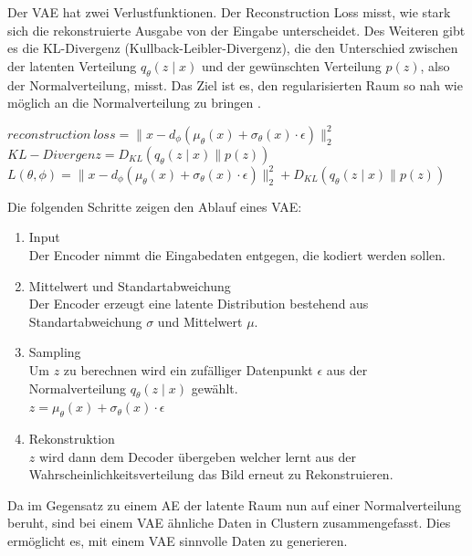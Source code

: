             Der VAE hat zwei Verlustfunktionen. Der Reconstruction Loss misst, wie stark sich die rekonstruierte Ausgabe von der Eingabe unterscheidet. Des Weiteren gibt es die KL-Divergenz (Kullback-Leibler-Divergenz), die den Unterschied zwischen der latenten Verteilung $q_\theta(z \mid x)$ und der gewünschten Verteilung $p(z)$, also der Normalverteilung, misst. Das Ziel ist es, den regularisierten Raum so nah wie möglich an die Normalverteilung zu bringen \cite{towards_ae_vae, vae_paper_1, vae_paper_2}.\bigskip
            \begin{center}
                $reconstruction \ loss = \| x - d_\phi(\mu_\theta(x) + \sigma_\theta(x) \cdot \epsilon) \|_2^2$\vspace{1mm}\\
                $KL-Divergenz = D_{KL}(q_\theta(z \mid x) \| p(z))$\vspace{1mm}\\
                $L(\theta, \phi) = \| x - d_\phi(\mu_\theta(x) + \sigma_\theta(x) \cdot \epsilon) \|_2^2 +
                D_{KL}(q_\theta(z \mid x) \| p(z))$
            \end{center}
            \bigskip

            Die folgenden Schritte zeigen den Ablauf eines VAE:
            \begin{enumerate}
                \item Input\\
                    Der Encoder nimmt die Eingabedaten entgegen, die kodiert werden sollen.
                \item Mittelwert und Standartabweichung\\
                    Der Encoder erzeugt eine latente Distribution bestehend aus Standartabweichung $\sigma$ und Mittelwert $\mu$.
                \item Sampling\\
                    Um $z$ zu berechnen wird ein zufälliger Datenpunkt $\epsilon$ aus der Normalverteilung $q_\theta(z \mid x)$ gewählt.\\
                    $z = \mu_\theta(x) + \sigma_\theta(x) \cdot \epsilon$
                \item Rekonstruktion\\
                    $z$ wird dann dem Decoder übergeben welcher lernt aus der Wahrscheinlichkeitsverteilung das Bild erneut zu Rekonstruieren. 
            \end{enumerate}
\newpage   
            Da im Gegensatz zu einem AE der latente Raum nun auf einer Normalverteilung beruht, sind bei einem VAE ähnliche Daten in Clustern zusammengefasst. Dies ermöglicht es, mit einem VAE sinnvolle Daten zu generieren.
    
